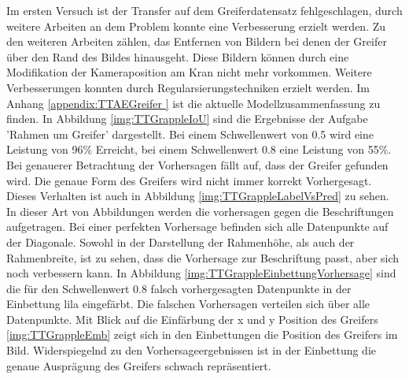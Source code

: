  	Im ersten Versuch ist der Transfer auf dem Greiferdatensatz fehlgeschlagen, durch weitere Arbeiten an dem Problem konnte eine Verbesserung erzielt werden. Zu den weiteren Arbeiten zählen, das Entfernen von Bildern bei denen der Greifer über den Rand des Bildes hinausgeht. Diese Bildern können durch eine Modifikation der Kameraposition am Kran nicht mehr vorkommen. Weitere Verbesserungen konnten durch Regularsierungstechniken erzielt werden. Im Anhang \ref{appendix:TTAEGreifer } ist die aktuelle Modellzusammenfassung zu finden.
 	In Abbildung \ref{img:TTGrappleIoU} sind die Ergebnisse der Aufgabe 'Rahmen um Greifer' dargestellt. Bei einem Schwellenwert von 0.5 wird eine Leistung von 96\% Erreicht, bei einem Schwellenwert 0.8 eine Leistung von 55\%. Bei genauerer Betrachtung der Vorhersagen fällt auf, dass der Greifer gefunden wird. Die genaue Form des Greifers wird nicht immer korrekt Vorhergesagt. Dieses Verhalten ist auch in Abbildung \ref{img:TTGrappleLabelVsPred} zu sehen. In dieser Art von Abbildungen werden die vorhersagen gegen die Beschriftungen aufgetragen. Bei einer perfekten Vorhersage befinden sich alle Datenpunkte auf der Diagonale. Sowohl in der Darstellung der Rahmenhöhe, als auch der Rahmenbreite, ist zu sehen, dass die Vorhersage zur Beschriftung passt, aber sich noch verbessern kann. In Abbildung \ref{img:TTGrappleEinbettungVorhersage} sind die für den Schwellenwert 0.8 falsch vorhergesagten Datenpunkte in der Einbettung lila eingefärbt. Die falschen Vorhersagen verteilen sich über alle Datenpunkte. Mit Blick auf die Einfärbung der x und y Position des Greifers \ref{img:TTGrappleEmb} zeigt sich in den Einbettungen die Position des Greifers im Bild. Widerspiegelnd zu den Vorhersageergebnissen ist in der Einbettung die genaue Ausprägung des Greifers schwach repräsentiert.
 	
